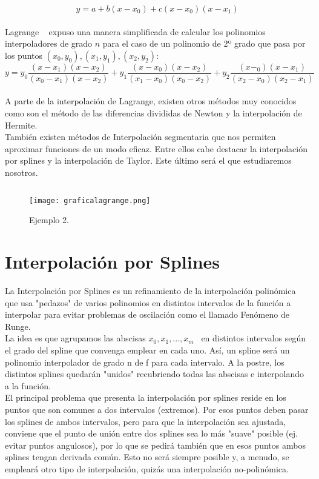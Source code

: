\documentclass[spanish,a4paper,11pt,twoside]{report}
\begin{document}
\[
y = a + b(x - x_0) + c(x - x_0)(x - x_1)
\]\\

Lagrange ~\cite{Lagrange} expuso una manera simplificada de calcular los polinomios interpoladores de grado $n$ para el caso de un polinomio de 2º grado que pasa por los puntos $(x_0, y_0), (x_1, y_1), (x_2, y_2)$:\\

\[
y = y_0\frac{(x - x_1)(x - x_2)}{(x_0 - x_1)(x - x_2)} + y_1\frac{(x- x_0)(x - x_2)}{(x_1 - x_0)(x_0 - x_2)} + y_2\frac{(x - _0)(x - x_1)}{(x_2 - x_0)(x_2 - x_1)}
\]\\ 

A parte de la interpolación de Lagrange, existen otros métodos muy conocidos como son el método de las diferencias divididas de Newton y la interpolación de Hermite.\\
También existen métodos de Interpolación segmentaria que nos permiten aproximar funciones de un modo eficaz. Entre ellos cabe destacar la interpolación por splines y la interpolación de Taylor. Este último será el que estudiaremos nosotros.
\begin{verbatim}

\end{verbatim}

\begin{figure}[h]
\begin{center}
\texttt{[image: graficalagrange.png]}
\caption{Ejemplo 2.}
\label{Ejemplo 2}
\end{center}
\end{figure}
\section{Interpolación por Splines}
	La Interpolación por Splines es un refinamiento de la interpolación polinómica que usa "pedazos" de varios polinomios en distintos intervalos de la función a interpolar para evitar problemas de oscilación como el llamado Fenómeno de Runge.\\

La idea es que agrupamos las abscisas $x_0,x_1,...,x_m$ \ en distintos intervalos según el grado del spline que convenga emplear en cada uno. Así, un spline será un polinomio interpolador de grado n de f para cada intervalo. A la postre, los distintos splines quedarán "unidos" recubriendo todas las abscisas e interpolando a la función.\\

El principal problema que presenta la interpolación por splines reside en los puntos que son comunes a dos intervalos (extremos). Por esos puntos deben pasar los splines de ambos intervalos, pero para que la interpolación sea ajustada, conviene que el punto de unión entre dos splines sea lo más "suave" posible (ej. evitar puntos angulosos), por lo que se pedirá también que en esos puntos ambos splines tengan derivada común. Esto no será siempre posible y, a menudo, se empleará otro tipo de interpolación, quizás una interpolación no-polinómica.\\
\end{document}
